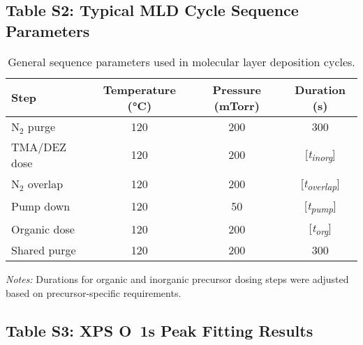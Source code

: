 \subsection*{Table S2: Typical MLD Cycle Sequence Parameters}
\begin{table}[htbp]
  \centering
  \caption{General sequence parameters used in molecular layer deposition cycles.}
  \label{tab:S2_mld_params}
  \begin{tabular}{lccc}
    \toprule
    \textbf{Step} & \textbf{Temperature (°C)} & \textbf{Pressure (mTorr)} & \textbf{Duration (s)} \\
    \midrule
    N$_2$ purge          & 120 & 200 & 300 \\
    TMA/DEZ dose         & 120 & 200 & [\emph{t\textsubscript{inorg}}] \\
    N$_2$ overlap        & 120 & 200 & [\emph{t\textsubscript{overlap}}] \\
    Pump down            & 120 & 50  & [\emph{t\textsubscript{pump}}] \\
    Organic dose         & 120 & 200 & [\emph{t\textsubscript{org}}] \\
    Shared purge         & 120 & 200 & 300 \\
    \bottomrule
  \end{tabular}
\end{table}

\vspace{1ex}
\noindent\textit{Notes:} Durations for organic and inorganic precursor dosing steps were adjusted based on precursor-specific requirements.

\subsection*{Table S3: XPS O~1s Peak Fitting Results}
\begin{table}[htbp]
\centering
\caption{Peak positions and relative areas for O~1s XPS spectra across bonding environments.}
\end{table}

